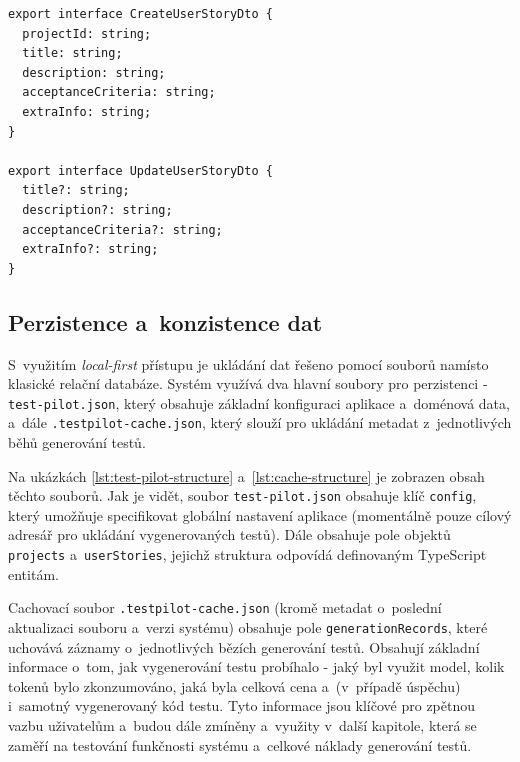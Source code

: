 \documentclass[czech, ing, kiv, he, iso690numb, viewonly]{fasthesis}
\begin{document}
\begin{lstlisting}[style=tscode, caption={\protect\centering Ukázka DTO objektů pro vytváření a~aktualizaci user stories.}, label={lst:shared-dtos}]
export interface CreateUserStoryDto {
  projectId: string;
  title: string;
  description: string;
  acceptanceCriteria: string;
  extraInfo: string;
}

export interface UpdateUserStoryDto {
  title?: string;
  description?: string;
  acceptanceCriteria?: string;
  extraInfo?: string;
}
\end{lstlisting}


\subsection{Perzistence a~konzistence dat}
S~využitím \textit{local-first} přístupu je ukládání dat řešeno pomocí souborů namísto klasické 
relační databáze. Systém využívá dva hlavní soubory pro perzistenci - 
\texttt{test-pilot.json}, který obsahuje základní konfiguraci aplikace a~doménová data, 
a~dále \texttt{.testpilot-cache.json}, 
který slouží pro ukládání metadat z~jednotlivých běhů generování testů.

Na ukázkách \ref{lst:test-pilot-structure} a~\ref{lst:cache-structure} je zobrazen obsah těchto souborů. Jak je vidět, soubor \texttt{test-pilot.json} obsahuje klíč \texttt{config}, který 
umožňuje specifikovat globální nastavení aplikace (momentálně pouze cílový adresář pro ukládání vygenerovaných testů).
Dále obsahuje pole objektů \texttt{projects} a~\texttt{userStories}, 
jejichž struktura odpovídá definovaným TypeScript entitám. 

Cachovací soubor \texttt{.testpilot-cache.json} 
(kromě metadat o~poslední aktualizaci souboru a~verzi systému)
obsahuje pole \texttt{generationRecords}, které uchovává záznamy o~jednotlivých bězích generování testů.
Obsahují základní informace o~tom, jak vygenerování testu probíhalo - jaký byl využit model,
kolik tokenů bylo zkonzumováno, jaká byla celková cena a~(v~případě úspěchu) i~samotný vygenerovaný kód testu. 
Tyto informace jsou klíčové pro zpětnou vazbu uživatelům a~budou dále zmíněny a~využity v~další kapitole,
která se zaměří na testování funkčnosti systému a~celkové náklady generování testů.
\end{document}

